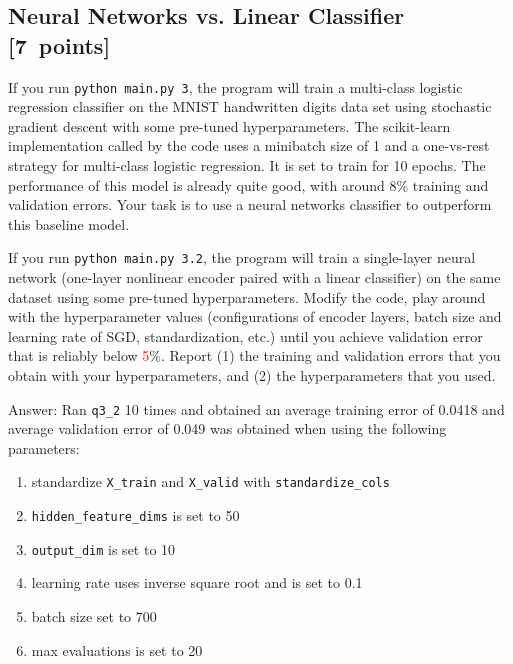 \documentclass{article}
\newcommand{\blu}[1]{{\textcolor{blu}{#1}}}
\newcommand{\red}[1]{\textcolor{red}{#1}}
\newenvironment{answer}{\par\begingroup\color{gre}Answer: }{\endgroup}
\let\ask\blu
\newcommand\pts[1]{\textcolor{pointscolour}{[#1~points]}}
\begin{document}
\subsection{Neural Networks vs. Linear Classifier \pts{7}}


If you run \texttt{python main.py 3}, the program will train a multi-class logistic regression classifier on the MNIST handwritten digits data set using stochastic gradient descent with some pre-tuned hyperparameters.
The scikit-learn implementation called by the code uses a minibatch size of 1 and a one-vs-rest strategy for multi-class logistic regression. It is set to train for 10 epochs.
The performance of this model is already quite good, with around 8\% training and validation errors. Your task is to use a neural networks classifier to outperform this baseline model.

If you run \texttt{python main.py 3.2}, the program will train a single-layer neural network (one-layer nonlinear encoder paired with a linear classifier) on the same dataset using some pre-tuned hyperparameters. Modify the code, play around with the hyperparameter values (configurations of encoder layers, batch size and learning rate of SGD, standardization, etc.) until you achieve validation error that is reliably below \red{5}\%. \ask{Report (1) the training and validation errors that you obtain with your hyperparameters, and (2) the hyperparameters that you used.}

\begin{answer}
    Ran \texttt{q3\_2} 10 times and obtained an average training error of 0.0418 and average validation error of 0.049 was obtained when using the following parameters:
    \begin{enumerate}
        \item standardize \texttt{X\_train} and \texttt{X\_valid} with \texttt{standardize\_cols}
        \item \texttt{hidden\_feature\_dims} is set to 50
        \item \texttt{output\_dim} is set to 10
        \item learning rate uses inverse square root and is set to 0.1
        \item batch size set to 700
        \item max evaluations is set to 20
    \end{enumerate}
\end{answer}
\newpage
\end{document}
